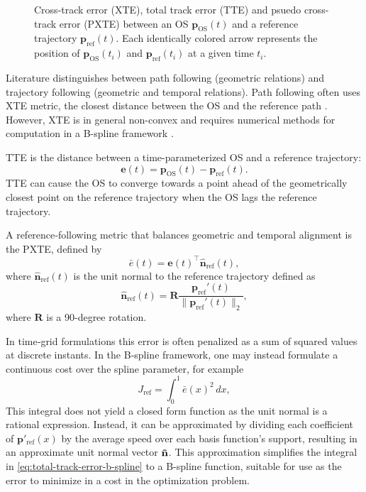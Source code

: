 \begin{figure}
    \centering
    
\caption{Cross-track error (XTE), total track error (TTE) and psuedo cross-track error (PXTE) between an OS $\mathbf p_\text{OS}(t)$ and a reference trajectory $\mathbf p_\text{ref}(t)$. Each identically colored arrow represents the position of $\mathbf p_\text{OS}(t_i)$ and $\mathbf p_\text{ref}(t_i)$ at a given time $t_i$.}
    \label{fig:cross-track-along-track-error}
\end{figure}

Literature distinguishes between path following (geometric relations) and trajectory following (geometric and temporal relations). Path following often uses \acrfull{XTE} metric, the closest distance between the OS and the reference path \citep{Fossen2011-Handbook}. However, XTE is in general non-convex and requires numerical methods for computation in a B-spline framework \citep{johnson2005distance,hu2005second,chen2009computing}.

\acrfull{TTE} is the distance between a time-parameterized OS and a reference trajectory:
\begin{equation}\label{eq:total-track-error}
    \mathbf e(t) = \mathbf p_\text{OS}(t) - \mathbf p_\text{ref}(t).
\end{equation}
TTE can cause the OS to converge towards a point ahead of the geometrically closest point on the reference trajectory when the OS lags the reference trajectory.


A reference‐following metric that balances geometric and temporal alignment is the \acrfull{PXTE}, defined by
\begin{equation}\label{eq:pxte}
  \bar e(t)
  = \mathbf e(t)^\top \mathbf{\hat n}_{\mathrm{ref}}(t),
\end{equation}
where $\mathbf{\hat n}_{\mathrm{ref}}(t)$ is the unit normal to the reference trajectory defined as 
\begin{equation}\label{eq:reference-normal-2}
    \mathbf{\hat n}_{\mathrm{ref}}(t) = \mathbf R\frac{\mathbf p_\text{ref}'(t)}{\|\mathbf p_\text{ref}'(t)\|_2},
\end{equation}
where $\mathbf R$ is a 90-degree rotation. 

In time‐grid formulations this error is often penalized as a sum of squared values at discrete instants. In the B‐spline framework, one may instead formulate a continuous cost over the spline parameter, for example
\begin{equation}\label{eq:total-track-error-b-spline}
J_\text{ref} = \int_0^1 \bar e(x)^2 \, dx,
\end{equation}
This integral does not yield a closed form function as the unit normal is a rational expression. Instead, it can be approximated by dividing each coefficient of $\mathbf p'_\text{ref}(x)$ by the average speed over each basis function's support, resulting in an approximate unit normal vector $\bf\tilde n$. This approximation simplifies the integral in \cref{eq:total-track-error-b-spline} to a B-spline function, suitable for use as the error to minimize in a cost in the optimization problem.






